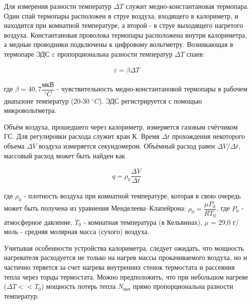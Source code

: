 \documentclass[a4paper,12pt]{article} %
\begin{document}
\noindent Для измерения разности температур $\Delta T$ служит медно-константановая термопара. Один спай термопары расположен в струе воздуха, входящего в калориметр, и находится при комнатной температуре, а второй - в струе выходящего нагретого воздуха. Константановая проволока термопары расположена внутри калориметра, а медные проводники подключены к цифровому вольтметру. Возникающая в термопаре ЭДС $\varepsilon$ пропорциональна разности температур $\Delta T$ спаев:

\begin{equation}
\begin{aligned}
\varepsilon = \beta \Delta T
\end{aligned}
\end{equation}

\noindent где $\beta = 40,7 \dfrac{\text{мкВ}}{ ^{\circ} C}$ - чувствительность медно-константановой термопары в рабочем диапазоне температур (20-30 $ ^{\circ} C$). ЭДС регистрируется с помощью микровольтметра.

\medskip

\noindent Объём воздуха, прошедшего через калориметр, измеряется газовым счётчиком ГС. Для регулировки расхода служит кран К. Время $\Delta t$ прохождения некоторого объема $\Delta V$ воздуха измеряется секундомером. Объёмный расход равен $\Delta V / \Delta t$, массовый расход может быть найден как

\begin{equation}
\begin{aligned}
q = \rho_0 \dfrac{\Delta V}{\Delta t} 
\end{aligned}
\end{equation}

\noindent где $\rho_0$ - плотность воздуха при комнатной температуре, которая в свою очередь может быть получена из уравнения Менделеева–Клапейрона: $\rho_0 = \dfrac{\mu P_0}{RT_0}$, где $P_0$ - атмосферное давление, $T_0$ - комнатная температура (в Кельвинах), $\mu$ = 29,0 г/моль - средняя молярная масса (сухого) воздуха.

\medskip

\noindent Учитывая особенности устройства калориметра, следует ожидать, что мощность нагревателя расходуется не только на нагрев массы прокачиваемого воздуха, но и частично теряется за счет нагрева внутренних стенок термостата и рассеяния тепла через торцы термостата. Можно предположить, что при небольшом нагреве ($\Delta T << T_0$) мощность потерь тепла $N_{\text{пот}}$ прямо пропорциональна разности температур:
\end{document}
